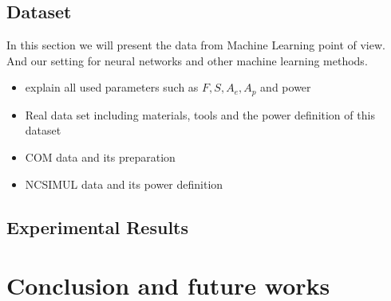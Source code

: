 \documentclass{article}
\begin{document}
\subsection{Dataset}
In this section we will present the data from Machine Learning point of view. And our setting for neural networks and other machine learning methods.
\begin{itemize}
\item explain all used parameters such as $F, S, A_e, A_p$ and power 
\item Real data set including materials, tools and the power definition of this dataset
\item COM data and its preparation 
\item NCSIMUL data and its power definition
\end{itemize} 
\subsection{Experimental Results}
 
\section{Conclusion and future works}
\end{document}
